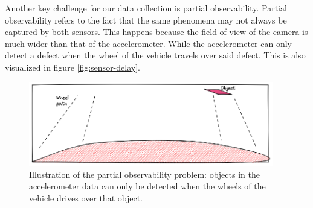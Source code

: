 Another key challenge for our data collection is partial observability. Partial observability refers to the fact that the same phenomena may not always be captured by both sensors. This happens because the field-of-view of the camera is much wider than that of the accelerometer. While the accelerometer can only detect a defect when the wheel of the vehicle travels over said defect. This is also visualized in figure \ref{fig:sensor-delay}.

\begin{figure}[ht]
\begin{center}
\includegraphics[width=0.95\textwidth,keepaspectratio]{images/2_literature/partial-observability.png}
\end{center}
\captionsetup{width=0.95\textwidth}
\caption{Illustration of the partial observability problem: objects in the accelerometer data can only be detected when the wheels of the vehicle drives over that object.}
\end{figure}



















